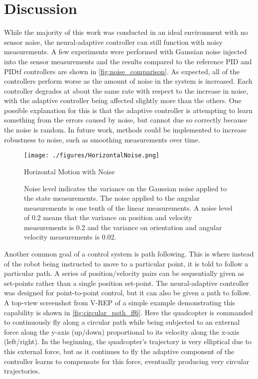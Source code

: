 \documentclass[letterpaper,12pt,titlepage,oneside,final]{book}
\begin{document}
\section{Discussion}

While the majority of this work was conducted in an ideal environment with no sensor noise, the neural-adaptive controller can still function with noisy measurements.
A few experiments were performed with Gaussian noise injected into the sensor measurements and the results compared to the reference PID and PIDtf controllers are shown in \autoref{fig:noise_comparison}.
As expected, all of the controllers perform worse as the amount of noise in the system is increased.
Each controller degrades at about the same rate with respect to the increase in noise, with the adaptive controller being affected slightly more than the others.
One possible explanation for this is that the adaptive controller is attempting to learn something from the errors caused by noise, but cannot due so correctly because the noise is random.
In future work, methods could be implemented to increase robustness to noise, such as smoothing measurements over time.

\begin{figure}
\centering
\texttt{[image: ./figures/HorizontalNoise.png]}
\caption{Horizontal Motion with Noise}
\label{fig:noise_comparison}
\captionsetup{singlelinecheck=off,font=footnotesize}
\caption*{
Noise level indicates the variance on the Gaussian noise applied to the state measurements. The noise applied to the angular measurements is one tenth of the linear measurements. A noise level of 0.2 means that the variance on position and velocity measurements is 0.2 and the variance on orientation and angular velocity measurements is 0.02.}
\end{figure}

Another common goal of a control system is path following.
This is where instead of the robot being instructed to move to a particular point, it is told to follow a particular path.
A series of position/velocity pairs can be sequentially given as set-points rather than a single position set-point.
The neural-adaptive controller was designed for point-to-point control, but it can also be given a path to follow.
A top-view screenshot from V-REP of a simple example demonstrating this capability is shown in \autoref{fig:circular_path_ff6}.
Here the quadcopter is commanded to continuously fly along a circular path while being subjected to an external force along the y-axis (up/down) proportional to its velocity along the x-axis (left/right).
In the beginning, the quadcopter's trajectory is very elliptical due to this external force, but as it continues to fly the adaptive component of the controller learns to compensate for this force, eventually producing very circular trajectories.
\end{document}
